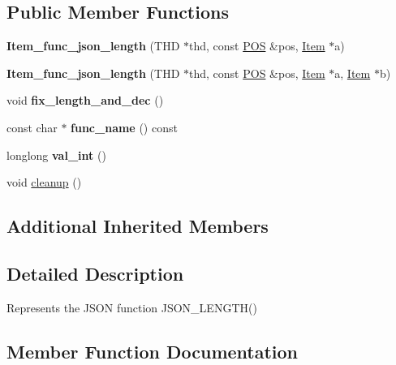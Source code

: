 \subsection*{Public Member Functions}
\begin{DoxyCompactItemize}
\item 
\mbox{\label{classItem__func__json__length_a7151bd4538b86892c3193079397a8b62}} 
{\bfseries Item\+\_\+func\+\_\+json\+\_\+length} (T\+HD $\ast$thd, const \mbox{\hyperlink{structYYLTYPE}{P\+OS}} \&pos, \mbox{\hyperlink{classItem}{Item}} $\ast$a)
\item 
\mbox{\label{classItem__func__json__length_ac50db8a28f4807318c5b13c9b4fdb7ba}} 
{\bfseries Item\+\_\+func\+\_\+json\+\_\+length} (T\+HD $\ast$thd, const \mbox{\hyperlink{structYYLTYPE}{P\+OS}} \&pos, \mbox{\hyperlink{classItem}{Item}} $\ast$a, \mbox{\hyperlink{classItem}{Item}} $\ast$b)
\item 
\mbox{\label{classItem__func__json__length_ad8c992fe772aefad9341d07bcbe1c1d7}} 
void {\bfseries fix\+\_\+length\+\_\+and\+\_\+dec} ()
\item 
\mbox{\label{classItem__func__json__length_aff5c05a37127c5542f02fc2d95efe434}} 
const char $\ast$ {\bfseries func\+\_\+name} () const
\item 
\mbox{\label{classItem__func__json__length_abd568b73297453d43e47aa354c01df51}} 
longlong {\bfseries val\+\_\+int} ()
\item 
void \mbox{\hyperlink{classItem__func__json__length_aaf23a99552281e8c9c0904535deadea4}{cleanup}} ()
\end{DoxyCompactItemize}
\subsection*{Additional Inherited Members}


\subsection{Detailed Description}
Represents the J\+S\+ON function J\+S\+O\+N\+\_\+\+L\+E\+N\+G\+T\+H() 

\subsection{Member Function Documentation}
\mbox{\label{classItem__func__json__length_aaf23a99552281e8c9c0904535deadea4}} 

